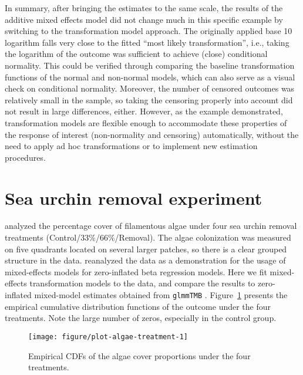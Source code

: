 \documentclass[11pt]{article}\usepackage[]{graphicx}\usepackage{xcolor}
\newenvironment{knitrout}{}{} %
\newcommand{\0}{{\mathbf{0}}}
\begin{document}
In summary,
after bringing the estimates to the same scale,
the results of the additive mixed effects model
did not change much in this specific example
by switching to the transformation model approach.
The originally applied base 10 logarithm falls very close
to the fitted ``most likely transformation'',
i.e., taking the logarithm of the outcome was sufficient
to achieve (close) conditional normality.
This could be verified through comparing
the baseline transformation functions of the normal and non-normal models,
which can also serve as a visual check on conditional normality.
Moreover, the number of censored outcomes
was relatively small in the sample,
so taking the censoring properly into account
did not result in large differences, either.
However, as the example demonstrated,
transformation models are flexible enough
to accommodate these properties
of the response of interest
(non-normality and censoring) automatically,
without the need to apply ad hoc transformations
or to implement new estimation procedures.


\section{Sea urchin removal experiment}

\citet{Andrew_1993} analyzed the percentage cover
of filamentous algae
under four sea urchin removal treatments (Control/33\%/66\%/Removal).
The algae colonization was measured
on five quadrants located on several larger patches,
so there is a clear grouped structure in the data.
\citet{Douma_2019} reanalyzed the data as a demonstration for the usage
of mixed-effects models for zero-inflated beta regression models.
Here we fit mixed-effects transformation models to the data,
and compare the results to zero-inflated mixed-model estimates
obtained from \texttt{glmmTMB} \citep{Brooks_2017}.
Figure~\ref{fig:algae-data} presents the empirical cumulative distribution functions
of the outcome under the four treatments.
Note the large number of zeros, especially in the control group.



\begin{figure}[!ht]
  \centering
\begin{knitrout}\small
{}\color{fgcolor}
\texttt{[image: figure/plot-algae-treatment-1]} 
\end{knitrout}
\caption{Empirical CDFs of the algae cover proportions under the four treatments.}\label{fig:algae-data}
\end{figure}
\end{document}
